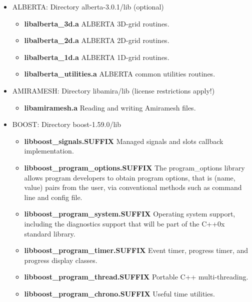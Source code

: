 \documentclass[11pt]{article}
\begin{document}
\begin{itemize}
\item ALBERTA: Directory alberta-3.0.1/lib (optional)
\begin{itemize}
\item  {\bf libalberta\_3d.a} \newline
    ALBERTA 3D-grid routines.
\item  {\bf libalberta\_2d.a} \newline
    ALBERTA 2D-grid routines.
\item  {\bf libalberta\_1d.a} \newline
    ALBERTA 1D-grid routines.
\item  {\bf libalberta\_utilities.a} \newline
    ALBERTA common utilities routines.
\end{itemize}
\item AMIRAMESH: Directory libamira/lib (license restrictions apply!)
\begin{itemize}
\item  {\bf libamiramesh.a}  \newline
       Reading and writing Amiramesh files.
\end{itemize}
\item BOOST: Directory boost-1.59.0/lib
\begin{itemize}
\item  {\bf libboost\_signals.SUFFIX} \newline
       Managed signals and slots callback implementation.
\item  {\bf libboost\_program\_options.SUFFIX} \newline
       The program\_options library allows program developers to obtain program options, that is (name, value) pairs from the user, via conventional methods such as command line and config file.
\item  {\bf libboost\_program\_system.SUFFIX} \newline
       Operating system support, including the diagnostics support that will be part of the C++0x standard library.
\item  {\bf libboost\_program\_timer.SUFFIX} \newline
       Event timer, progress timer, and progress display classes.
\item  {\bf libboost\_program\_thread.SUFFIX} \newline
       Portable C++ multi-threading.
\item  {\bf libboost\_program\_chrono.SUFFIX} \newline
       Useful time utilities.
       

\end{itemize}
\end{itemize}
\end{document}
